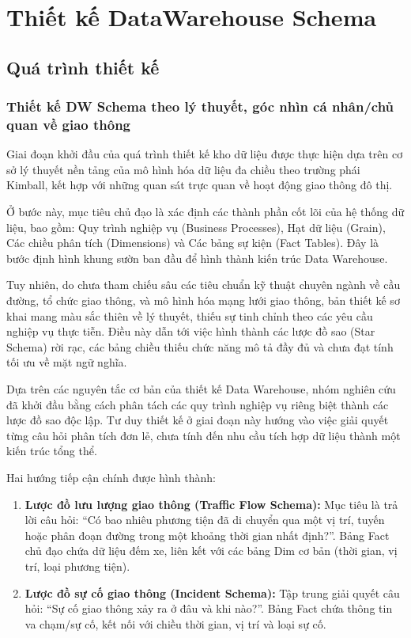 \section{Thiết kế DataWarehouse Schema}
\subsection{Quá trình thiết kế}
\subsubsection{Thiết kế DW Schema theo lý thuyết, góc nhìn cá nhân/chủ quan về giao thông}

Giai đoạn khởi đầu của quá trình thiết kế kho dữ liệu được thực hiện dựa trên cơ sở lý thuyết nền tảng của mô hình hóa dữ liệu đa chiều theo trường phái Kimball, kết hợp với những quan sát trực quan về hoạt động giao thông đô thị.

Ở bước này, mục tiêu chủ đạo là xác định các thành phần cốt lõi của hệ thống dữ liệu, bao gồm: Quy trình nghiệp vụ (Business Processes), Hạt dữ liệu (Grain), Các chiều phân tích (Dimensions) và Các bảng sự kiện (Fact Tables). Đây là bước định hình khung sườn ban đầu để hình thành kiến trúc Data Warehouse.

Tuy nhiên, do chưa tham chiếu sâu các tiêu chuẩn kỹ thuật chuyên ngành về cầu đường, tổ chức giao thông, và mô hình hóa mạng lưới giao thông, bản thiết kế sơ khai mang màu sắc thiên về lý thuyết, thiếu sự tinh chỉnh theo các yêu cầu nghiệp vụ thực tiễn. Điều này dẫn tới việc hình thành các lược đồ sao (Star Schema) rời rạc, các bảng chiều thiếu chức năng mô tả đầy đủ và chưa đạt tính tối ưu về mặt ngữ nghĩa.

Dựa trên các nguyên tắc cơ bản của thiết kế Data Warehouse, nhóm nghiên cứu đã khởi đầu bằng cách phân tách các quy trình nghiệp vụ riêng biệt thành các lược đồ sao độc lập. Tư duy thiết kế ở giai đoạn này hướng vào việc giải quyết từng câu hỏi phân tích đơn lẻ, chưa tính đến nhu cầu tích hợp dữ liệu thành một kiến trúc tổng thể.

Hai hướng tiếp cận chính được hình thành:
\begin{enumerate}
    \item \textbf{Lược đồ lưu lượng giao thông (Traffic Flow Schema):} Mục tiêu là trả lời câu hỏi: “Có bao nhiêu phương tiện đã di chuyển qua một vị trí, tuyến hoặc phân đoạn đường trong một khoảng thời gian nhất định?”. Bảng Fact chủ đạo chứa dữ liệu đếm xe, liên kết với các bảng Dim cơ bản (thời gian, vị trí, loại phương tiện).
    \item \textbf{Lược đồ sự cố giao thông (Incident Schema):} Tập trung giải quyết câu hỏi: “Sự cố giao thông xảy ra ở đâu và khi nào?”. Bảng Fact chứa thông tin va chạm/sự cố, kết nối với chiều thời gian, vị trí và loại sự cố.
\end{enumerate}

